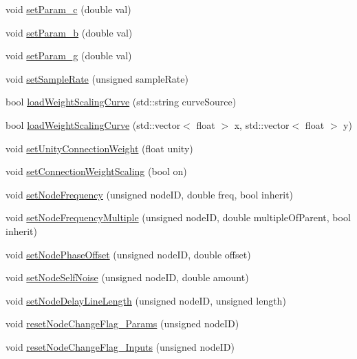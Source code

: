 \begin{DoxyCompactItemize}
\item 
void \mbox{\hyperlink{classCPG_a21e3d9ae738df133b65efbc4ad4bb51a}{set\+Param\+\_\+c}} (double val)
\item 
void \mbox{\hyperlink{classCPG_a7da2207c51449752c5fcaf242f2a01e9}{set\+Param\+\_\+b}} (double val)
\item 
void \mbox{\hyperlink{classCPG_ae62c8cdcb43ab515477ca5fcac94f5e1}{set\+Param\+\_\+g}} (double val)
\item 
void \mbox{\hyperlink{classCPG_af2a9107312b1344e19d2aca96a2da4c2}{set\+Sample\+Rate}} (unsigned sample\+Rate)
\item 
bool \mbox{\hyperlink{classCPG_a61c0a3f2278d4a1db88d1d5a7dd0771f}{load\+Weight\+Scaling\+Curve}} (std\+::string curve\+Source)
\item 
bool \mbox{\hyperlink{classCPG_a8e1cb030a864fc7aecbe9e394b0b6e03}{load\+Weight\+Scaling\+Curve}} (std\+::vector$<$ float $>$ x, std\+::vector$<$ float $>$ y)
\item 
void \mbox{\hyperlink{classCPG_a3ba255f2cd3577c5bab856b71169b445}{set\+Unity\+Connection\+Weight}} (float unity)
\item 
void \mbox{\hyperlink{classCPG_a78a7b481668202d413e5630f5803da3c}{set\+Connection\+Weight\+Scaling}} (bool on)
\item 
void \mbox{\hyperlink{classCPG_a6c8b0a674e597f7559033339621baba9}{set\+Node\+Frequency}} (unsigned node\+ID, double freq, bool inherit)
\item 
void \mbox{\hyperlink{classCPG_af04ee786919ee5284041780a1f3e0502}{set\+Node\+Frequency\+Multiple}} (unsigned node\+ID, double multiple\+Of\+Parent, bool inherit)
\item 
void \mbox{\hyperlink{classCPG_a6333bf3b624bd2742384ddea032a885f}{set\+Node\+Phase\+Offset}} (unsigned node\+ID, double offset)
\item 
void \mbox{\hyperlink{classCPG_aec5c18fe5931482820d203e8e190eefe}{set\+Node\+Self\+Noise}} (unsigned node\+ID, double amount)
\item 
void \mbox{\hyperlink{classCPG_a79f22916b43191ac6a5be7f5cbe185e4}{set\+Node\+Delay\+Line\+Length}} (unsigned node\+ID, unsigned length)
\item 
void \mbox{\hyperlink{classCPG_a4bc2674914fb92eddb4cb0e67562cb64}{reset\+Node\+Change\+Flag\+\_\+\+Params}} (unsigned node\+ID)
\item 
void \mbox{\hyperlink{classCPG_a8523c6ee51d46aad0bd07c45090e8de3}{reset\+Node\+Change\+Flag\+\_\+\+Inputs}} (unsigned node\+ID)
\item 

\end{DoxyCompactItemize}
